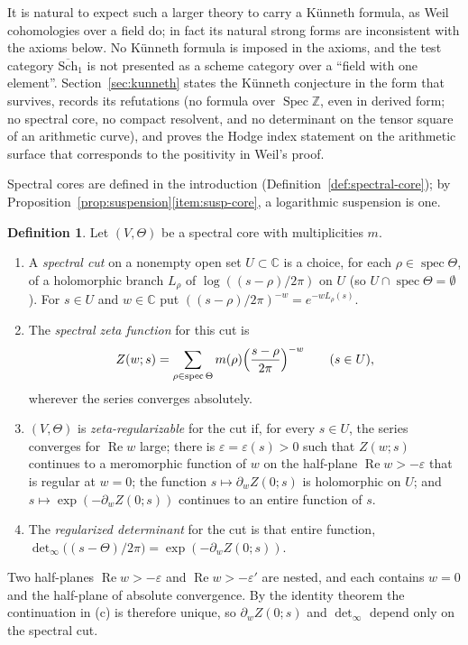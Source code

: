 \documentclass[11pt]{amsart}
\theoremstyle{plain}
\theoremstyle{definition}
\newtheorem{definition}[theorem]{Definition}
\theoremstyle{remark}
\numberwithin{equation}{section}
\newcommand{\C}{\mathbb{C}}
\newcommand{\Z}{\mathbb{Z}}
\newcommand{\Schbar}{\overline{\mathrm{Sch}}}
\DeclareMathOperator{\Spec}{Spec}
\DeclareMathOperator{\spec}{spec}
\DeclareMathOperator{\Rea}{Re}
\newcommand{\detreg}{{\det}_{\infty}}
\renewcommand{\Re}{\Rea}
\begin{document}
It is natural to expect such a larger theory to carry a K\"unneth
formula, as Weil cohomologies over a field do; in fact its natural
strong forms are inconsistent with the axioms below. No K\"unneth
formula is imposed in the axioms, and the test category $\Schbar_1$ is not
presented as a scheme category over a ``field with one element''.
Section~\ref{sec:kunneth} states the K\"unneth conjecture in the form
that survives, records its refutations (no formula over $\Spec\Z$, even
in derived form; no spectral core, no compact resolvent, and no
determinant on the tensor square of an arithmetic curve), and proves the
Hodge index statement on the arithmetic surface that corresponds to the
positivity in Weil's proof.

Spectral cores are defined in the introduction
(Definition~\ref{def:spectral-core});
 by
Proposition~\ref{prop:suspension}\ref{item:susp-core}, a logarithmic
suspension is one.

\begin{definition}\label{def:regdet}
Let $(V,\Theta)$ be a spectral core with multiplicities $m$.
\begin{enumerate}[label=(\alph*)]
\item A \emph{spectral cut} on a nonempty open set $U\subset\C$ is a
  choice, for each $\rho\in\spec\Theta$, of a holomorphic branch
  $L_\rho$ of $\log((s-\rho)/2\pi)$ on $U$ (so $U\cap\spec\Theta=
  \emptyset$). For $s\in U$ and $w\in\C$ put
  $((s-\rho)/2\pi)^{-w}=e^{-wL_\rho(s)}$.
\item The \emph{spectral zeta function} for this cut is
  \[
  Z(w;s)=\sum_{\rho\in\spec\Theta}m(\rho)
    \Bigl(\frac{s-\rho}{2\pi}\Bigr)^{-w}\qquad(s\in U),
  \]
  wherever the series converges absolutely.
\item $(V,\Theta)$ is \emph{zeta-regularizable} for the cut if, for
  every $s\in U$, the series converges for $\Re w$ large; there is
  $\varepsilon=\varepsilon(s)>0$ such that $Z(w;s)$ continues to a
  meromorphic function of $w$ on the half-plane $\Re w>-\varepsilon$
  that is regular at $w=0$; the function $s\mapsto\partial_wZ(0;s)$ is
  holomorphic on $U$; and $s\mapsto\exp(-\partial_wZ(0;s))$ continues to
  an entire function of $s$.
\item The \emph{regularized determinant} for the cut is that entire
  function, $\detreg\bigl((s-\Theta)/2\pi\bigr)=
  \exp(-\partial_wZ(0;s))$.
\end{enumerate}
\end{definition}

Two half-planes $\Re w>-\varepsilon$ and $\Re w>-\varepsilon'$ are
nested, and each contains $w=0$ and the half-plane of absolute
convergence. By the identity theorem the continuation in (c) is
therefore unique, so $\partial_wZ(0;s)$ and $\detreg$ depend only on
the spectral cut.
\end{document}
